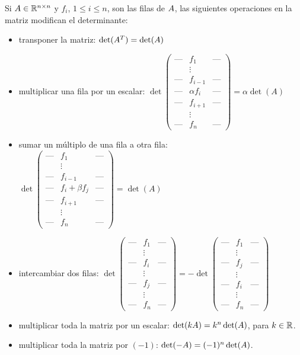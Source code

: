 \begin{prop} Si $\Ab \in  \R^{n \times n}$ y $f_i$, $1 \le i \le n$, son las filas de $\Ab$, las siguientes operaciones en la matriz modifican el determinante:
\begin{itemize}
\item transponer la matriz: $\det(\Ab^T) = \det(\Ab)$
\item multiplicar una fila por un escalar: $\det\begin{pmatrix} \text{---} & f_1 & \text{---}\\ & \vdots & \\ \text{---} & f_{i-1} & \text{---}\\ \text{---} & \alpha f_i & \text{---}\\ \text{---} & f_{i+1} & \text{---} \\ & \vdots & \\ \text{---} & f_n  & \text{---}\end{pmatrix} = \alpha \det(A)$
\item sumar un múltiplo de una fila a otra fila: $\det\begin{pmatrix} \text{---} & f_1 & \text{---}\\ & \vdots & \\ \text{---} & f_{i-1} & \text{---}\\ \text{---} & f_i + \beta f_j & \text{---}\\ \text{---} & f_{i+1} & \text{---} \\ & \vdots & \\ \text{---} & f_n  & \text{---}\end{pmatrix} = \det(A)$
\item intercambiar dos filas: $\det\begin{pmatrix} \text{---} & f_1   & \text{---}\\ & \vdots   & \\ \text{---} & f_{i}   & \text{---}\\ & \vdots & \\ \text{---} & f_{j}   & \text{---}\\  & \vdots   & \\ \text{---} & f_n   & \text{---} \end{pmatrix} = - \det\begin{pmatrix} \text{---} & f_1   & \text{---}\\ & \vdots   & \\ \text{---} & f_{j}   & \text{---}\\ & \vdots & \\ \text{---} & f_{i}   & \text{---}\\  & \vdots   & \\ \text{---} & f_n   & \text{---} \end{pmatrix}$
\item multiplicar toda la matriz por un escalar: $\det(k\Ab)=k^n \det(\Ab)$, para $k \in \mathbb R$.
\item multiplicar toda la matriz por $(-1)$: $\det(-\Ab)=(-1)^n \det(\Ab)$.
\end{itemize}
\end{prop}


